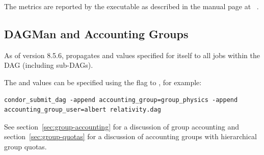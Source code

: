 The metrics are reported by the
 executable
as described in the manual page at
~\pageref{man-condor-dagman-metrics-reporter}.

\subsection{\label{sec:DAGAcctGrp}DAGMan and Accounting Groups}

As of version 8.5.6,  propagates
 and 
values specified for  itself to all jobs within the
DAG (including sub-DAGs).

The  and 
values can be specified using the  flag to
, for example:

\begin{verbatim}
condor_submit_dag -append accounting_group=group_physics -append accounting_group_user=albert relativity.dag
\end{verbatim}

See section~\ref{sec:group-accounting} for a discussion of group accounting
and section~\ref{sec:group-quotas} for a discussion of accounting groups
with hierarchical group quotas.


